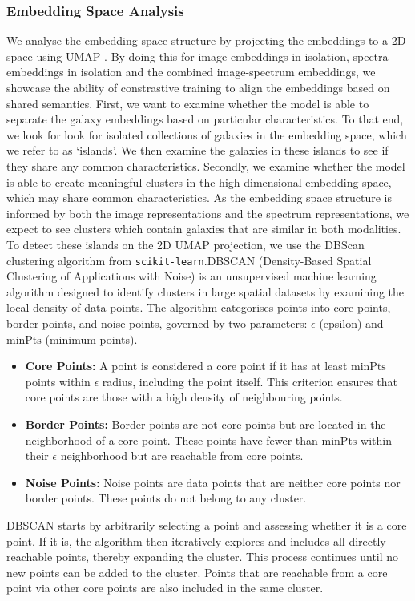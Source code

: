 \documentclass[a4paper,12pt]{article}
\begin{document}
\subsubsection*{Embedding Space Analysis}
We analyse the embedding space structure by projecting the embeddings to a 2D space using UMAP \cite{UMAP}. By doing this for image embeddings in isolation, spectra embeddings in isolation and the combined image-spectrum embeddings, we showcase the ability of constrastive training to align the embeddings based on shared semantics. First, we want to examine whether the model is able to separate the galaxy embeddings based on particular characteristics. To that end, we look for look for isolated collections of galaxies in the embedding space, which we refer to as `islands'. We then examine the galaxies in these islands to see if they share any common characteristics. Secondly, we examine whether the model is able to create meaningful clusters in the high-dimensional embedding space, which may share common characteristics. As the embedding space structure is informed by both the image representations and the spectrum representations, we expect to see clusters which contain galaxies that are similar in both modalities.
To detect these islands on the 2D UMAP projection, we use the DBScan clustering algorithm \cite{dbscan} from \verb|scikit-learn|.DBSCAN (Density-Based Spatial Clustering of Applications with Noise) is an unsupervised machine learning algorithm designed to identify clusters in large spatial datasets by examining the local density of data points. The algorithm categorises points into core points, border points, and noise points, governed by two parameters: $\epsilon$ (epsilon) and $\text{minPts}$ (minimum points).

\begin{itemize}
    \item \textbf{Core Points:} A point is considered a core point if it has at least $\text{minPts}$ points within $\epsilon$ radius, including the point itself. This criterion ensures that core points are those with a high density of neighbouring points.

    \item \textbf{Border Points:} Border points are not core points but are located in the neighborhood of a core point. These points have fewer than $\text{minPts}$ within their $\epsilon$ neighborhood but are reachable from core points.

    \item \textbf{Noise Points:} Noise points are data points that are neither core points nor border points. These points do not belong to any cluster.
\end{itemize}
DBSCAN starts by arbitrarily selecting a point and assessing whether it is a core point. If it is, the algorithm then iteratively explores and includes all directly reachable points, thereby expanding the cluster. This process continues until no new points can be added to the cluster. Points that are reachable from a core point via other core points are also included in the same cluster.
\end{document}
